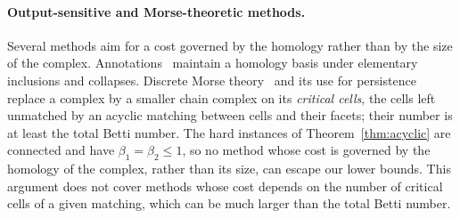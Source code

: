 \paragraph{Output-sensitive and Morse-theoretic methods.}
Several methods aim for a cost governed by the homology rather than by the size of the complex.
Annotations~\cite{BCCDW12,DFW14} maintain a homology basis under elementary inclusions and collapses.
Discrete Morse theory~\cite{For98} and its use for persistence~\cite{MN13} replace a complex by a smaller chain complex on its \emph{critical cells}, the cells left unmatched by an acyclic matching between cells and their facets; their number is at least the total Betti number.
The hard instances of Theorem~\ref{thm:acyclic} are connected and have $\beta_1=\beta_2\le1$, so no method whose cost is governed by the homology of the complex, rather than its size, can escape our lower bounds.
This argument does not cover methods whose cost depends on the number of critical cells of a given matching, which can be much larger than the total Betti number.
